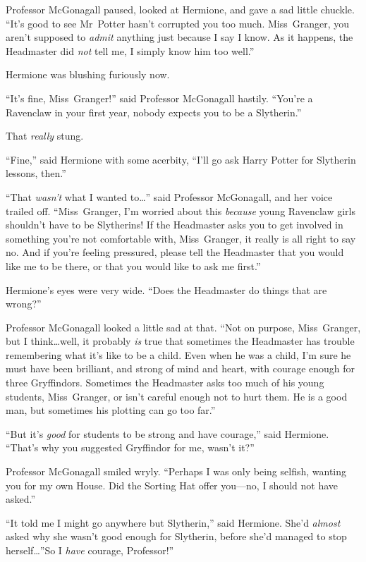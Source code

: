 Professor McGonagall paused, looked at Hermione, and gave a sad little chuckle.
“It’s good to see Mr~Potter hasn’t corrupted you too much. Miss~Granger, you
aren’t supposed to \emph{admit} anything just because I say I know. As it
happens, the Headmaster did \emph{not} tell me, I simply know him too well.”

Hermione was blushing furiously now.

“It’s fine, Miss~Granger!” said Professor McGonagall hastily. “You’re a
Ravenclaw in your first year, nobody expects you to be a Slytherin.”

That \emph{really} stung.

“Fine,” said Hermione with some acerbity, “I’ll go ask Harry Potter for
Slytherin lessons, then.”

“That \emph{wasn’t} what I wanted to…” said Professor McGonagall, and
her voice trailed off. “Miss~Granger, I’m worried about this \emph{because}
young Ravenclaw girls shouldn’t have to be Slytherins! If the Headmaster asks
you to get involved in something you’re not comfortable with, Miss~Granger, it
really is all right to say no. And if you’re feeling pressured, please tell the
Headmaster that you would like me to be there, or that you would like to ask me
first.”

Hermione’s eyes were very wide. “Does the Headmaster do things that are wrong?”

Professor McGonagall looked a little sad at that. “Not on purpose,
Miss~Granger, but I think…well, it probably \emph{is} true that sometimes
the Headmaster has trouble remembering what it’s like to be a child. Even when
he was a child, I’m sure he must have been brilliant, and strong of mind and
heart, with courage enough for three Gryffindors. Sometimes the Headmaster asks
too much of his young students, Miss~Granger, or isn’t careful enough not to
hurt them. He is a good man, but sometimes his plotting can go too far.”

“But it’s \emph{good} for students to be strong and have courage,” said
Hermione. “That’s why you suggested Gryffindor for me, wasn’t it?”

Professor McGonagall smiled wryly. “Perhaps I was only being selfish, wanting
you for my own House. Did the Sorting Hat offer you—no, I should not have
asked.”

“It told me I might go anywhere but Slytherin,” said Hermione. She’d
\emph{almost} asked why she wasn’t good enough for Slytherin, before she’d
managed to stop herself…”So I \emph{have} courage, Professor!”

